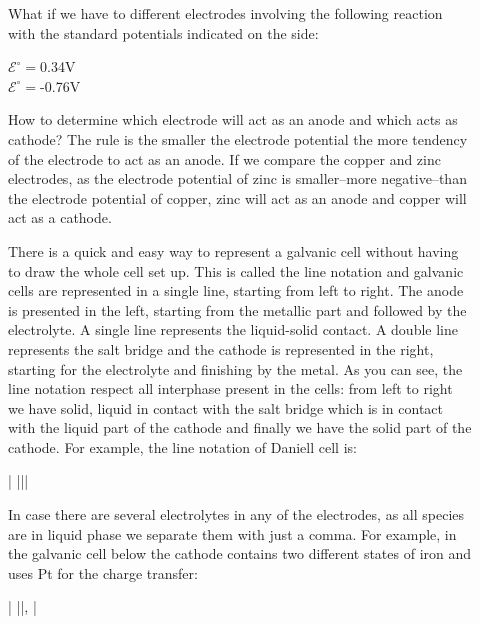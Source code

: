 \documentclass[main.tex]{subfiles}
\begin{document}
\begin{description}
\item[]
What if we have to different electrodes involving the following reaction with the standard potentials indicated on the side:
\begin{center}\hfill $\mathcal{E}^{\circ}=$0.34V\\
\hfill $\mathcal{E}^{\circ}=$-0.76V\end{center}
How to determine which electrode will act as an anode and which acts as cathode? The rule is the smaller the electrode potential the more tendency of the electrode to act as an anode. If we compare the copper and zinc electrodes, as the electrode potential of zinc is smaller--more negative--than the electrode potential of copper, zinc will act as an anode and copper will act as a cathode.

\item[]
There is a quick and easy way to represent a galvanic cell without having to draw the whole cell set up. This is called the line notation and galvanic cells are represented in a single line, starting from left to right. The anode is presented in the left, starting from the metallic part and followed by the electrolyte. A single line represents the liquid-solid contact. A double line represents the salt bridge and the cathode is represented in the right, starting for the electrolyte and finishing by the metal. As you can see, the line notation respect all interphase present in the cells: from left to right we have solid, liquid in contact with the salt bridge which is in contact with the liquid part of the cathode and finally we have the solid part of the cathode.
For example, the line notation of Daniell cell is:
\begin{center}| |||	\end{center}

In case there are several electrolytes in any of the electrodes, as all species are in liquid phase we separate them with just a comma. For example, in the galvanic cell below the cathode contains two different states of iron and uses Pt for the charge transfer:
\begin{center}| ||, |	\end{center}

\end{description}
\end{document}
